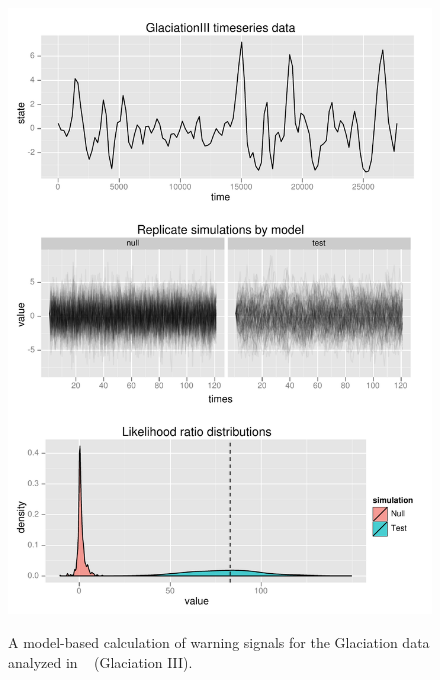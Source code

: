 \documentclass[authoryear,preprint,11pt]{elsarticle}
\begin{document}
 \begin{figure}
   \begin{center}
     \includegraphics[width=\linewidth]{figures/GlaciationIII_warningsignal.pdf}
     \label{fig:glaciation}
     \caption{A model-based calculation of warning signals for the Glaciation data analyzed in ~\citet{Dakos2008} (Glaciation III).}
  \end{center}
 \end{figure}
\end{document}

